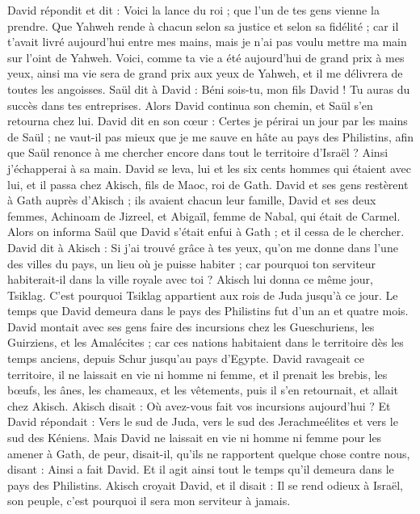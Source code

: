 \begin{multicols}{2}
David répondit et dit : Voici la lance du roi ; que l'un de tes gens vienne la prendre.
Que Yahweh rende à chacun selon sa justice et selon sa fidélité ; car il t'avait livré aujourd'hui entre mes mains, mais je n'ai pas voulu mettre ma main sur l'oint de Yahweh.
Voici, comme ta vie a été aujourd'hui de grand prix à mes yeux, ainsi ma vie sera de grand prix aux yeux de Yahweh, et il me délivrera de toutes les angoisses.
Saül dit à David : Béni sois-tu, mon fils David ! Tu auras du succès dans tes entreprises. Alors David continua son chemin, et Saül s'en retourna chez lui.
\VerseOne{}David dit en son cœur : Certes je périrai un jour par les mains de Saül ; ne vaut-il pas mieux que je me sauve en hâte au pays des Philistins, afin que Saül renonce à me chercher encore dans tout le territoire d'Israël ? Ainsi j'échapperai à sa main.
David se leva, lui et les six cents hommes qui étaient avec lui, et il passa chez Akisch, fils de Maoc, roi de Gath.
David et ses gens restèrent à Gath auprès d'Akisch ; ils avaient chacun leur famille, David et ses deux femmes, Achinoam de Jizreel, et Abigaïl, femme de Nabal, qui était de Carmel.
Alors on informa Saül que David s'était enfui à Gath ; et il cessa de le chercher.
David dit à Akisch : Si j'ai trouvé grâce à tes yeux, qu'on me donne dans l'une des villes du pays, un lieu où je puisse habiter ; car pourquoi ton serviteur habiterait-il dans la ville royale avec toi ?
Akisch lui donna ce même jour, Tsiklag. C'est pourquoi Tsiklag appartient aux rois de Juda jusqu'à ce jour.
Le temps que David demeura dans le pays des Philistins fut d'un an et quatre mois.
David montait avec ses gens faire des incursions chez les Gueschuriens, les Guirziens, et les Amalécites ; car ces nations habitaient dans le territoire dès les temps anciens, depuis Schur jusqu'au pays d'Egypte.
David ravageait ce territoire, il ne laissait en vie ni homme ni femme, et il prenait les brebis, les bœufs, les ânes, les chameaux, et les vêtements, puis il s'en retournait, et allait chez Akisch.
Akisch disait : Où avez-vous fait vos incursions aujourd'hui ? Et David répondait : Vers le sud de Juda, vers le sud des Jerachmeélites et vers le sud des Kéniens.
Mais David ne laissait en vie ni homme ni femme pour les amener à Gath, de peur, disait-il, qu'ils ne rapportent quelque chose contre nous, disant : Ainsi a fait David. Et il agit ainsi tout le temps qu'il demeura dans le pays des Philistins.
Akisch croyait David, et il disait : Il se rend odieux à Israël, son peuple, c'est pourquoi il sera mon serviteur à jamais.

\end{multicols}
